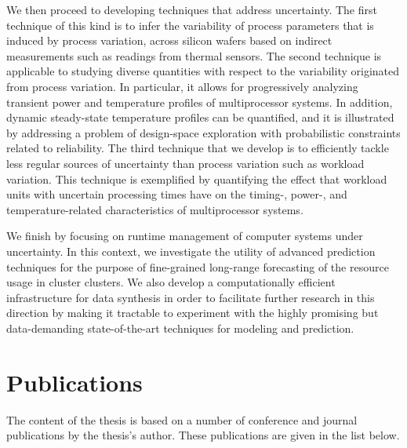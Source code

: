 We then proceed to developing techniques that address uncertainty. The first
technique of this kind is to infer the variability of process parameters that is
induced by process variation, across silicon wafers based on indirect
measurements such as readings from thermal sensors. The second technique is
applicable to studying diverse quantities with respect to the variability
originated from process variation. In particular, it allows for progressively
analyzing transient power and temperature profiles of multiprocessor systems. In
addition, dynamic steady-state temperature profiles can be quantified, and it is
illustrated by addressing a problem of design-space exploration with
probabilistic constraints related to reliability. The third technique that we
develop is to efficiently tackle less regular sources of uncertainty than
process variation such as workload variation. This technique is exemplified by
quantifying the effect that workload units with uncertain processing times have
on the timing-, power-, and temperature-related characteristics of
multiprocessor systems.

We finish by focusing on runtime management of computer systems under
uncertainty. In this context, we investigate the utility of advanced prediction
techniques for the purpose of fine-grained long-range forecasting of the
resource usage in cluster clusters. We also develop a computationally efficient
infrastructure for data synthesis in order to facilitate further research in
this direction by making it tractable to experiment with the highly promising
but data-demanding state-of-the-art techniques for modeling and prediction.

\section{Publications}

The content of the thesis is based on a number of conference and journal
publications by the thesis's author. These publications are given in the list
below.

\printbibliography[heading=none,keyword=own]

